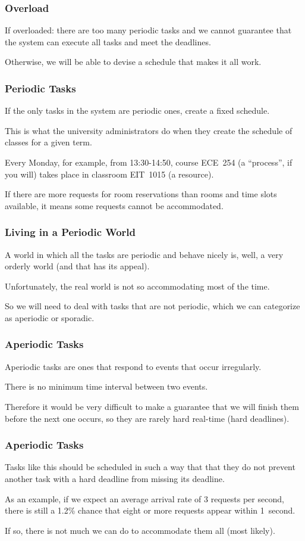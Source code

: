 \begin{frame}
\frametitle{Overload}
If overloaded: there are too many periodic tasks and we cannot guarantee that the system can execute all tasks and meet the deadlines. 

Otherwise, we will be able to devise a schedule that makes it all work.

\end{frame}

\begin{frame}
\frametitle{Periodic Tasks}

If the only tasks in the system are periodic ones, create a fixed schedule. 

This is what the university administrators do when they create the schedule of classes for a given term.

 Every Monday, for example, from 13:30-14:50, course ECE~254 (a ``process'', if you will) takes place in classroom EIT~1015 (a resource). 
 
If there are more requests for room reservations than rooms and time slots available, it means some requests cannot be accommodated.

\end{frame}

\begin{frame}
\frametitle{Living in a Periodic World}

A world in which all the tasks are periodic and behave nicely is, well, a very orderly world (and that has its appeal). 

Unfortunately, the real world is not so accommodating most of the time. 

So we will need to deal with tasks that are not periodic, which we can categorize as \alert{aperiodic} or \alert{sporadic}.

\end{frame}

\begin{frame}
\frametitle{Aperiodic Tasks}

Aperiodic tasks are ones that respond to events that occur irregularly. 

There is no minimum time interval between two events.

Therefore it would be very difficult to make a guarantee that we will finish them before the next one occurs, so they are rarely hard real-time (hard deadlines). 

\end{frame}

\begin{frame}
\frametitle{Aperiodic Tasks}

Tasks like this should be scheduled in such a way that that they do not prevent another task with a hard deadline from missing its deadline. 

As an example, if we expect an average arrival rate of 3 requests per second, there is still a 1.2\% chance that eight or more requests appear within 1~second. 

If so, there is not much we can do to accommodate them all (most likely).

\end{frame}

